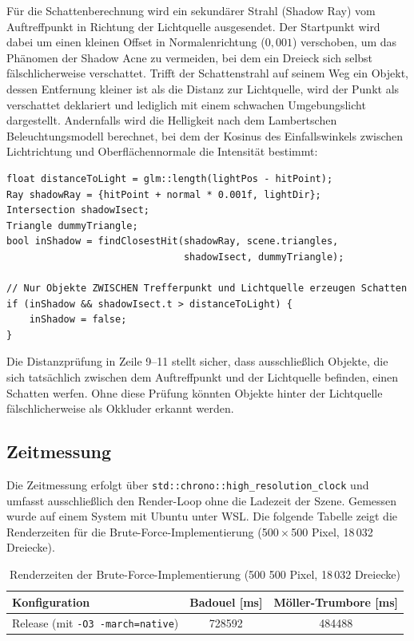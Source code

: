 \documentclass[11pt, a4paper]{article}
\begin{document}
Für die Schattenberechnung wird ein sekundärer Strahl (Shadow Ray) vom Auftreffpunkt in Richtung der Lichtquelle ausgesendet. Der Startpunkt wird dabei um einen kleinen Offset in Normalenrichtung ($0{,}001$) verschoben, um das Phänomen der Shadow Acne zu vermeiden, bei dem ein Dreieck sich selbst fälschlicherweise verschattet. Trifft der Schattenstrahl auf seinem Weg ein Objekt, dessen Entfernung kleiner ist als die Distanz zur Lichtquelle, wird der Punkt als verschattet deklariert und lediglich mit einem schwachen Umgebungslicht dargestellt. Andernfalls wird die Helligkeit nach dem Lambertschen Beleuchtungsmodell berechnet, bei dem der Kosinus des Einfallswinkels zwischen Lichtrichtung und Oberflächennormale die Intensität bestimmt:

\begin{lstlisting}[caption={Schattenstrahl mit Distanzprüfung}]
float distanceToLight = glm::length(lightPos - hitPoint);
Ray shadowRay = {hitPoint + normal * 0.001f, lightDir};
Intersection shadowIsect;
Triangle dummyTriangle;
bool inShadow = findClosestHit(shadowRay, scene.triangles,
                               shadowIsect, dummyTriangle);

// Nur Objekte ZWISCHEN Trefferpunkt und Lichtquelle erzeugen Schatten
if (inShadow && shadowIsect.t > distanceToLight) {
    inShadow = false;
}
\end{lstlisting}

Die Distanzprüfung in Zeile 9--11 stellt sicher, dass ausschließlich Objekte, die sich tatsächlich zwischen dem Auftreffpunkt und der Lichtquelle befinden, einen Schatten werfen. Ohne diese Prüfung könnten Objekte hinter der Lichtquelle fälschlicherweise als Okkluder erkannt werden.

\subsection{Zeitmessung}
\label{sec:zeitmessung}

Die Zeitmessung erfolgt über \texttt{std::chrono::high\_resolution\_clock} und umfasst ausschließlich den Render-Loop ohne die Ladezeit der Szene. Gemessen wurde auf einem System mit Ubuntu unter WSL. Die folgende Tabelle zeigt die Renderzeiten für die Brute-Force-Implementierung (500\,$\times$\,500 Pixel, 18\,032 Dreiecke).

\begin{table}[H]
    \centering
    \caption{Renderzeiten der Brute-Force-Implementierung (500\,\times\,500 Pixel, 18\,032 Dreiecke)}
    \label{tab:zeiten-aufgabe1}
    \begin{tabular}{l S[table-format=6.0] S[table-format=6.0]}
        \toprule
        \textbf{Konfiguration} & {\textbf{Badouel [ms]}} & {\textbf{Möller-Trumbore [ms]}} \\
        \midrule
        Release (mit \texttt{-O3 -march=native})    & 728592 & 484488 \\
        \bottomrule
    \end{tabular}
\end{table}
\end{document}
